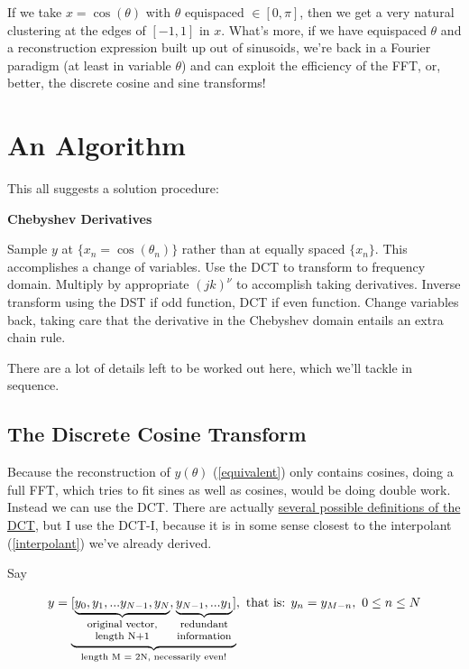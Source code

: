 \documentclass[10pt]{article}
\begin{document}
If we take $x = \cos(\theta)$ with $\theta$ equispaced $\in [0, \pi]$, then we get a very natural clustering at the edges of $[-1, 1]$ in $x$. What's more, if we have equispaced $\theta$ and a reconstruction expression built up out of sinusoids, we're back in a Fourier paradigm (at least in variable $\theta$) and can exploit the efficiency of the FFT, or, better, the discrete cosine and sine transforms!\cite{dct}\cite{dst}

\section{An Algorithm}\label{algo}

This all suggests a solution procedure:

\begin{algorithm}
\caption*{\textbf{Chebyshev Derivatives}}
\begin{algorithmic}[1] %
	\STATE Sample $y$ at $\{x_n = \cos(\theta_n)\}$ rather than at equally spaced $\{x_n\}$. This accomplishes a change of variables.
	\STATE Use the DCT to transform to frequency domain.
	\STATE Multiply by appropriate $(jk)^\nu$ to accomplish taking derivatives.
	\STATE Inverse transform using the DST if odd function, DCT if even function.
	\STATE Change variables back, taking care that the derivative in the Chebyshev domain entails an extra chain rule.
\end{algorithmic}
\end{algorithm}

There are a lot of details left to be worked out here, which we'll tackle in sequence.

\subsection{The Discrete Cosine Transform}

Because the reconstruction of $y(\theta)$ (\autoref{equivalent}) only contains cosines, doing a full FFT, which tries to fit sines as well as cosines, would be doing double work. Instead we can use the DCT. There are actually \href{https://docs.scipy.org/doc/scipy/reference/generated/scipy.fft.dct.html}{several possible definitions of the DCT}\cite{dct}, but I use the DCT-I, because it is in some sense closest to the interpolant (\autoref{interpolant}) we've already derived.

Say

$$y = \underbrace{[\underbrace{y_0, y_1, ... y_{N-1}, y_N}_{\parbox{20mm}{\footnotesize \centering original vector, length N+1}}, \underbrace{y_{N-1}, ... y_1}_{\parbox{16mm}{\footnotesize \centering redundant information}}]}_{\text{length M = 2N, necessarily even!}}, \text{ that is: } y_n = y_{M-n},\ 0 \leq n \leq N$$
\end{document}
